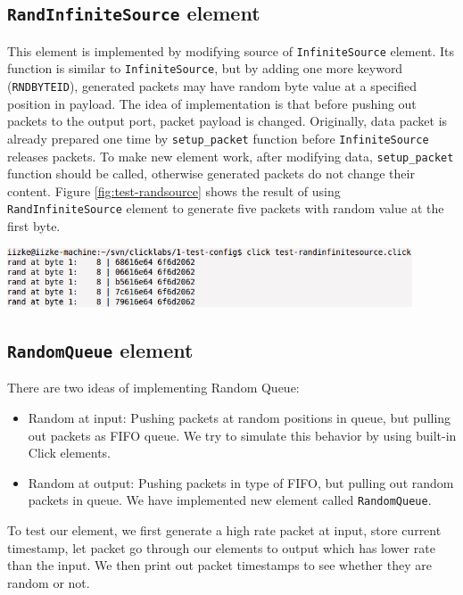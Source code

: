 \documentclass[a4paper]{article}
\begin{document}
  \subsection{\texttt{RandInfiniteSource} element}
  This element is implemented by modifying source of \texttt{InfiniteSource} element. Its function is similar to \texttt{InfiniteSource}, but by adding one more keyword (\texttt{RNDBYTEID}), generated packets may have random byte value at a specified position in payload. The idea of implementation is that before pushing out packets to the output port, packet payload is changed. Originally, data packet is already prepared one time by \texttt{setup\_packet} function before \texttt{InfiniteSource} releases packets. To make new element work, after modifying data, \texttt{setup\_packet} function should be called, otherwise generated packets do not change their content. Figure \ref{fig:test-randsource} shows the result of using \texttt{RandInfiniteSource} element to generate five packets with random value at the first byte.
  \begin{center}
	\includegraphics[width=0.9\textwidth]{test-randinfinitesource.png}
	\label{fig:test-randsource}
  \end{center}

  \subsection{\texttt{RandomQueue} element}
  There are two ideas of implementing Random Queue:
  \begin{itemize}
  	\item Random at input: Pushing packets at random positions in queue, but pulling out packets as FIFO queue. We try to simulate this behavior by using built-in Click elements.
  	\item Random at output: Pushing packets in type of FIFO, but pulling out random packets in queue. We have implemented new element called \texttt{RandomQueue}.
  \end{itemize}
  To test our element, we first generate a high rate packet at input, store current timestamp, let packet go through our elements to output which has lower rate than the input. We then print out packet timestamps to see whether they are random or not.
\end{document}
